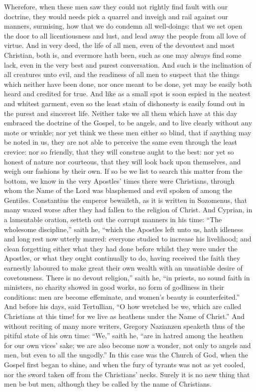 Wherefore, when these men saw they could not rightly find fault with
our doctrine, they would needs pick a quarrel and inveigh and rail against
our manners, surmising, how that we do condemn all well-doings: that
we set open the door to all licentiousness and lust, and lead away the
people from all love of virtue. And in very deed, the life of
all men, even of the devoutest and most Christian, both is, and evermore
hath been, such as one may always find some lack, even in the very best
and purest conversation. And such is the inclination of all creatures
unto evil, and the readiness of all men to suspect that the things which
neither have been done, nor once meant to be done, yet may be easily
both heard and credited for true. And like as a small spot is
soon espied in the neatest and whitest garment, even so the least stain
of dishonesty is easily found out in the purest and sincerest life.
Neither take we all them which have at this day embraced the doctrine
of the Gospel, to be angels, and to live clearly without any mote or
wrinkle; nor yet think
we these men either so blind, that if anything may be noted in us, they
are not able to perceive the same even through the least crevice: nor
so friendly, that they will construe aught to the best: nor yet so honest
of nature nor courteous, that they will look back upon themselves, and
weigh our fashions by their own. If so be we list to search this
matter from the bottom, we know in the very Apostles’ times there
were Christians, through whom the Name of the Lord was blasphemed and
evil spoken of among the Gentiles. Constantius the emperor bewaileth,
as it is written in Sozomenus, that many waxed worse after they had
fallen to the religion of Christ. And Cyprian, in a lamentable
oration, setteth out the corrupt manners in his time: “The wholesome
discipline,” saith he, “which the Apostles left unto us,
hath idleness and long rest now utterly marred: everyone studied to
increase his livelihood; and clean forgetting either what they had done
before whilst they were under the Apostles, or what they ought continually
to do, having received the faith they earnestly laboured to make great
their own wealth with an unsatiable desire of covetousness. There
is no devout religion,” saith he, “in priests, no sound
faith in ministers, no charity showed in good works, no form
of godliness in their conditions: men are become effeminate, and women’s
beauty is counterfeited.” And before his days, said Tertullian,
“O how wretched be we, which are called Christians at this time!
for we live as heathens under the Name of Christ.” And without
reciting of many more writers, Gregory Nazianzen speaketh thus of the
pitiful state of his own time: “We,” saith he, “are
in hatred among the heathen for our own vices’ sake; we are also
become now a wonder, not only to angels and men, but even to all the
ungodly.” In this case was the Church of God, when the Gospel
first began to shine, and when the fury of tyrants was not as yet cooled,
nor the sword taken off from the Christians’ necks. Surely
it is no new thing that men be but men, although they be called by the
name of Christians.

